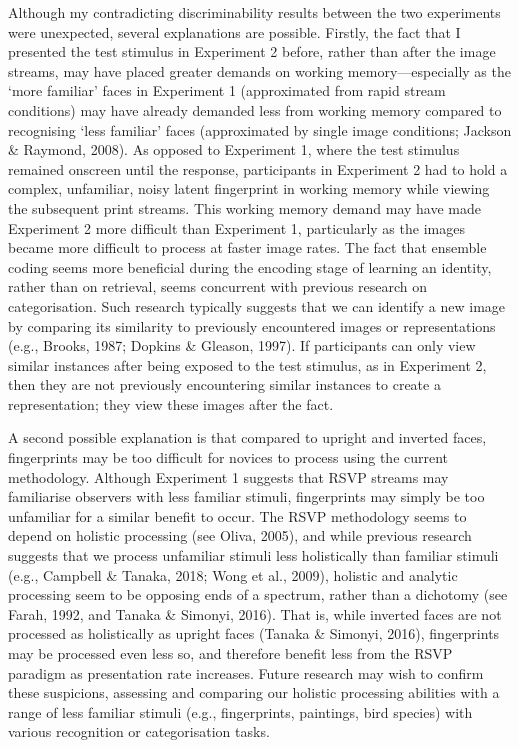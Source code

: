 \documentclass[
  english,
  man]{apa6}
\begin{document}
Although my contradicting discriminability results between the two experiments were unexpected, several explanations are possible. Firstly, the fact that I presented the test stimulus in Experiment 2 before, rather than after the image streams, may have placed greater demands on working memory---especially as the `more familiar' faces in Experiment 1 (approximated from rapid stream conditions) may have already demanded less from working memory compared to recognising `less familiar' faces (approximated by single image conditions; Jackson \& Raymond, 2008). As opposed to Experiment 1, where the test stimulus remained onscreen until the response, participants in Experiment 2 had to hold a complex, unfamiliar, noisy latent fingerprint in working memory while viewing the subsequent print streams. This working memory demand may have made Experiment 2 more difficult than Experiment 1, particularly as the images became more difficult to process at faster image rates. The fact that ensemble coding seems more beneficial during the encoding stage of learning an identity, rather than on retrieval, seems concurrent with previous research on categorisation. Such research typically suggests that we can identify a new image by comparing its similarity to previously encountered images or representations (e.g., Brooks, 1987; Dopkins \& Gleason, 1997). If participants can only view similar instances after being exposed to the test stimulus, as in Experiment 2, then they are not previously encountering similar instances to create a representation; they view these images after the fact.

A second possible explanation is that compared to upright and inverted faces, fingerprints may be too difficult for novices to process using the current methodology. Although Experiment 1 suggests that RSVP streams may familiarise observers with less familiar stimuli, fingerprints may simply be too unfamiliar for a similar benefit to occur. The RSVP methodology seems to depend on holistic processing (see Oliva, 2005), and while previous research suggests that we process unfamiliar stimuli less holistically than familiar stimuli (e.g., Campbell \& Tanaka, 2018; Wong et al., 2009), holistic and analytic processing seem to be opposing ends of a spectrum, rather than a dichotomy (see Farah, 1992, and Tanaka \& Simonyi, 2016). That is, while inverted faces are not processed as holistically as upright faces (Tanaka \& Simonyi, 2016), fingerprints may be processed even less so, and therefore benefit less from the RSVP paradigm as presentation rate increases. Future research may wish to confirm these suspicions, assessing and comparing our holistic processing abilities with a range of less familiar stimuli (e.g., fingerprints, paintings, bird species) with various recognition or categorisation tasks.
\end{document}
